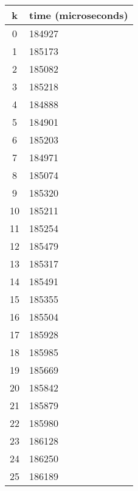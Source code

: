 \begin{figure}
	\begin{tabular}{| c | l |}
		\hline
		k & time (microseconds)\\
		\hline
		0 & 184927\\
		\hline
		1 & 185173\\
		\hline
		2 & 185082\\
		\hline
		3 & 185218\\
		\hline
		4 & 184888\\
		\hline
		5 & 184901\\
		\hline
		6 & 185203\\
		\hline
		7 & 184971\\
		\hline
		8 & 185074\\
		\hline
		9 & 185320\\
		\hline
		10 & 185211\\
		\hline
		11 & 185254\\
		\hline
		12 & 185479\\
		\hline
		13 & 185317\\
		\hline
		14 & 185491\\
		\hline
		15 & 185355\\
		\hline
		16 & 185504\\
		\hline
		17 & 185928\\
		\hline
		18 & 185985\\
		\hline
		19 & 185669\\
		\hline
		20 & 185842\\
		\hline
		21 & 185879\\
		\hline
		22 & 185980\\
		\hline
		23 & 186128\\
		\hline
		24 & 186250\\
		\hline
		25 & 186189\\
		\hline
	\end{tabular}
\end{figure}

